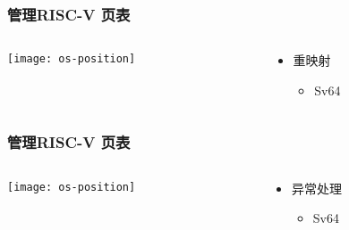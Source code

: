 \begin{frame} 
	\frametitle{管理RISC-V 页表}
	
	\begin{columns}
		
		\begin{column}{.5\textwidth}
			
			\texttt{[image: os-position]}
			
		\end{column}
		
		
		\begin{column}{.5\textwidth}
			
			\begin{itemize}\Large
				\item 重映射
				\begin{itemize}\large
					\item Sv64
					
				\end{itemize}
			\end{itemize}
			
		\end{column}
		
		
	\end{columns}
	
\end{frame}


\begin{frame} 
	\frametitle{管理RISC-V 页表}
	
	\begin{columns}
		
		\begin{column}{.5\textwidth}
			
			\texttt{[image: os-position]}
			
		\end{column}
		
		
		\begin{column}{.5\textwidth}
			
			\begin{itemize}\Large
				\item 异常处理
				\begin{itemize}\large
					\item Sv64
					
				\end{itemize}
			\end{itemize}
			
		\end{column}
		
		
	\end{columns}
	
\end{frame}



